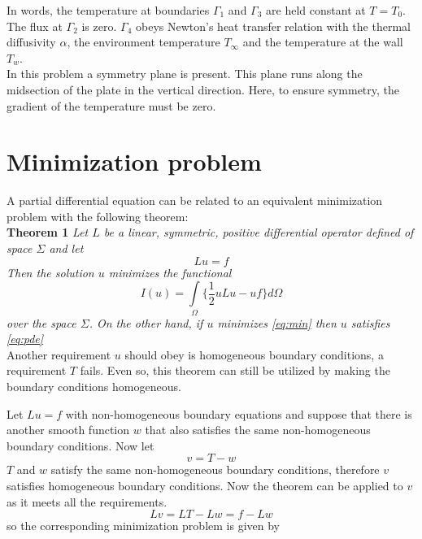 \documentclass[10pt,a4paper]{article}
\begin{document}
In words, the temperature at boundaries $\Gamma_1$ and $\Gamma_3$ are held constant at $T=T_0$. The flux at $\Gamma_2$ is zero. $\Gamma_4$ obeys Newton's heat transfer relation with the thermal diffusivity $\alpha$, the environment temperature $T_{\infty}$ and the temperature at the wall $T_w$.\\

In this problem a symmetry plane is present. This plane runs along the midsection of the plate in the vertical direction. Here, to ensure symmetry, the gradient of the temperature must be zero.

\section{Minimization problem}
A partial differential equation can be related to an equivalent minimization problem with the following theorem:\\

\textbf{Theorem 1 }\textit{Let $L$ be a linear, symmetric, positive differential operator defined of space $\Sigma$ and let}
\begin{equation}\label{eq:pde}
Lu=f
\end{equation}
\textit{Then the solution $u$ minimizes the functional}
\begin{equation}\label{eq:min}
I(u) = \underset{\Omega}{\int}\{\frac{1}{2}uLu-uf\}d\Omega
\end{equation}  \textit{over the space $\Sigma$. On the other hand, if $u$ minimizes \eqref{eq:min} then $u$ satisfies \eqref{eq:pde}} \\

Another requirement $u$ should obey is homogeneous boundary conditions, a requirement $T$ fails. Even so, this theorem can still be utilized by making the boundary conditions homogeneous.

Let $Lu=f$ with non-homogeneous boundary equations and suppose that there is another smooth function $w$ that also satisfies the same non-homogeneous boundary conditions. Now let 
\begin{equation}\label{eq:v}
v=T-w
\end{equation}
$T$ and $w$ satisfy the same non-homogeneous boundary conditions, therefore $v$ satisfies homogeneous boundary conditions. Now the theorem can be applied to $v$ as it meets all the requirements. \\

\begin{equation}\label{rhsv}
Lv=LT-Lw=f-Lw
\end{equation}
so the corresponding minimization problem is given by 
\end{document}
